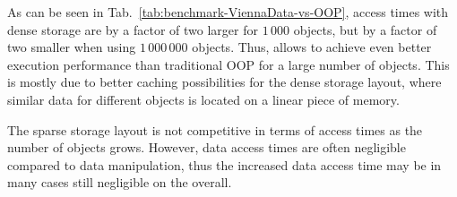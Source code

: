 As can be seen in Tab.~\ref{tab:benchmark-ViennaData-vs-OOP}, access times with dense storage are by a factor of two larger for $1\,000$ objects, but by a factor of two smaller when using $1\,000\,000$ objects.
Thus, {\ViennaData} allows to achieve even better execution performance than traditional OOP for a large number of objects. This is mostly due to better caching possibilities for the dense storage layout, where similar data for different objects is located on a linear piece of memory.

The sparse storage layout is not competitive in terms of access times as the number of objects grows. However, data access times are often negligible compared to data manipulation, thus
the increased data access time may be in many cases still negligible on the overall.